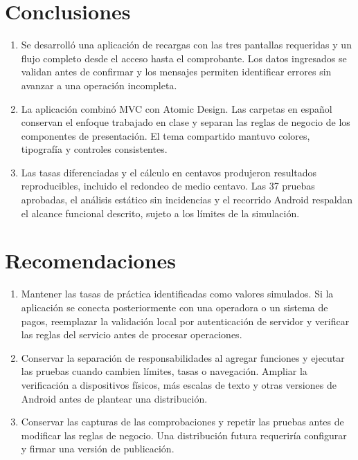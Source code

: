 \documentclass[12pt,letterpaper]{article}
\begin{document}
\section{Conclusiones}
\begin{enumerate}[leftmargin=*]
\item Se desarrolló una aplicación de recargas con las tres pantallas requeridas y un flujo completo desde el acceso hasta el comprobante. Los datos ingresados se validan antes de confirmar y los mensajes permiten identificar errores sin avanzar a una operación incompleta.
\item La aplicación combinó MVC con Atomic Design. Las carpetas en español conservan el enfoque trabajado en clase y separan las reglas de negocio de los componentes de presentación. El tema compartido mantuvo colores, tipografía y controles consistentes.
\item Las tasas diferenciadas y el cálculo en centavos produjeron resultados reproducibles, incluido el redondeo de medio centavo. Las 37 pruebas aprobadas, el análisis estático sin incidencias y el recorrido Android respaldan el alcance funcional descrito, sujeto a los límites de la simulación.
\end{enumerate}

\section{Recomendaciones}
\begin{enumerate}[leftmargin=*]
\item Mantener las tasas de práctica identificadas como valores simulados. Si la aplicación se conecta posteriormente con una operadora o un sistema de pagos, reemplazar la validación local por autenticación de servidor y verificar las reglas del servicio antes de procesar operaciones.
\item Conservar la separación de responsabilidades al agregar funciones y ejecutar las pruebas cuando cambien límites, tasas o navegación. Ampliar la verificación a dispositivos físicos, más escalas de texto y otras versiones de Android antes de plantear una distribución.
\item Conservar las capturas de las comprobaciones y repetir las pruebas antes de modificar las reglas de negocio. Una distribución futura requeriría configurar y firmar una versión de publicación.
\end{enumerate}
\end{document}
